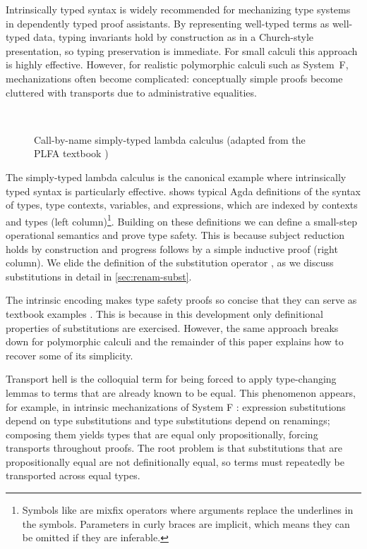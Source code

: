 \documentclass[manuscript,screen,review,anonymous,acmsmall]{acmart}
\begin{document}
Intrinsically typed syntax is widely recommended for mechanizing type
systems in dependently typed proof assistants. By representing
well-typed terms as well-typed data, typing invariants hold by
construction as in a Church-style presentation, so typing
preservation is immediate. For small 
calculi this approach is highly effective. However, for realistic
polymorphic calculi such as System~F, mechanizations often become
complicated: conceptually simple proofs become cluttered with
transports due to administrative equalities. 

\begin{figure}[tp]
  \begin{minipage}[t]{0.49\linewidth}
  \STLCTypeCtx
  \STLCVar
  \STLCExpr 
  \end{minipage}
  ~
  \begin{minipage}[t]{0.49\linewidth}
    \STLCSmallStep
    \STLCProgress
  \end{minipage}
  \caption{Call-by-name simply-typed lambda calculus (adapted from the PLFA textbook \cite{DBLP:journals/scp/KokkeSW20})}
  \label{fig:simply-typed-syntax}
\end{figure}
The simply-typed lambda calculus is the canonical example where
intrinsically typed syntax is particularly effective. 
shows typical Agda definitions of the 
syntax of types, type contexts, variables, and expressions, which are
indexed by contexts and types (left column)\footnote{Symbols like
  \AgdaFunction{$\_\rhd\_$} are mixfix operators where arguments
  replace the underlines in the symbols. Parameters in curly braces
  are implicit, which means they can be omitted if they are
  inferable.}. Building on these definitions we 
can define a small-step operational semantics and
prove type safety. This is because subject reduction holds by construction and progress
follows by a simple inductive proof (right column). We elide the definition  of the
substitution operator \AgdaFunction{$\_[\_]$}, as we discuss substitutions in detail
in \cref{sec:renam-subst}.

The intrinsic encoding makes type safety proofs so concise that they can serve as textbook
examples \cite{DBLP:journals/scp/KokkeSW20}. This is because in this development only definitional
properties of substitutions are exercised. 
However, the same approach breaks down for polymorphic calculi and the remainder of this
paper explains how to recover some of its simplicity.

Transport hell is the colloquial term for being forced to apply
type-changing lemmas to terms that are already known to be equal.
This phenomenon appears, for example,
in intrinsic mechanizations of System F
\cite{10.1007/978-3-030-33636-3_10,10.1145/3678000.3678201,DBLP:journals/jar/BentonHKM12}:
expression substitutions
depend on type substitutions and type substitutions depend on
renamings; composing them yields types that are equal only
propositionally, forcing transports throughout proofs. 
The root problem is that substitutions that are propositionally equal
are not definitionally equal, so terms must repeatedly be transported
across equal types. 
\end{document}
